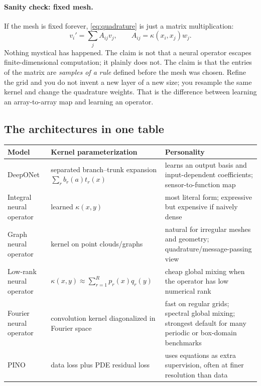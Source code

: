 \documentclass[10pt,a4paper]{article}
\begin{document}
\paragraph{Sanity check: fixed mesh.}
If the mesh is fixed forever, \eqref{eq:quadrature} is just a matrix
multiplication:
\[
  v_i' = \sum_j A_{ij} v_j,
  \qquad
  A_{ij} = \kappa(x_i,x_j)w_j.
\]
Nothing mystical has happened. The claim is not that a neural operator
escapes finite-dimensional computation; it plainly does not. The claim is
that the entries of the matrix are \emph{samples of a rule} defined before
the mesh was chosen. Refine the grid and you do not invent a new layer of a
new size; you resample the same kernel and change the quadrature weights.
That is the difference between learning an array-to-array map and
learning an operator.

\subsection{The architectures in one table}

\begin{center}
\footnotesize
\begin{tabular}{@{}>{\raggedright\arraybackslash}p{2.4cm}>{\raggedright\arraybackslash}p{4.2cm}>{\raggedright\arraybackslash}p{7.4cm}@{}}
\toprule
Model & Kernel parameterization & Personality \\
\midrule
DeepONet & separated branch--trunk expansion
$\sum_r b_r(a)t_r(x)$ & learns an output basis and input-dependent
coefficients; sensor-to-function map \\
Integral neural operator & learned $\kappa(x,y)$ & most literal form;
expressive but expensive if naively dense \\
Graph neural operator & kernel on point clouds/graphs & natural for
irregular meshes and geometry; quadrature/message-passing view \\
Low-rank neural operator & $\kappa(x,y) \approx \sum_{r=1}^R p_r(x)q_r(y)$ &
cheap global mixing when the operator has low numerical rank \\
Fourier neural operator & convolution kernel diagonalized in Fourier space &
fast on regular grids; spectral global mixing; strongest default for many
periodic or box-domain benchmarks \\
PINO & data loss plus PDE residual loss & uses equations as extra supervision,
often at finer resolution than data \\
\bottomrule
\end{tabular}
\end{center}
\end{document}
